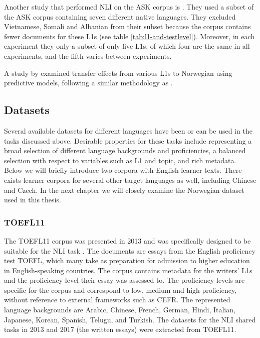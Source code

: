 Another study that performed NLI on the ASK corpus is
\textcite{ionescu2016string}. They used a subset of the ASK corpus containing
seven different native languages. They excluded Vietnamese, Somali and
Albanian from their subset because the corpus contains fewer documents for
these \acp{L1} (see table \ref{tab:l1-and-testlevel}). Moreover, in each
experiment they only a subset of only five \acp{L1}, of which four are the
same in all experiments, and the fifth varies between experiments.

A study by \textcite{pepper2012} examined transfer effects from various
\acp{L1} to Norwegian using predictive models, following a similar
methodology as \textcite{jarvis2012detecting}.


\subsection{Datasets}

Several available datasets for different languages have been or can be used
in the tasks discussed above. Desirable properties for these tasks include
representing a broad selection of different language backgrounds and
proficiencies, a balanced selection with respect to variables such as L1 and
topic, and rich metadata. Below we will briefly introduce two corpora with
English learner texts. There exists learner corpora for several other target
languages as well, including Chinese and Czech. In the next chapter we will
closely examine the Norwegian dataset used in this thesis.


\subsubsection{TOEFL11}

The TOEFL11 corpus was presented in 2013 and was specifically designed to be
suitable for the \ac{NLI} task \autocite{blanchard13}. The documents are
essays from the English proficiency test TOEFL, which many take as
preparation for admission to higher education in English-speaking countries.
The corpus contains metadata for the writers' L1s and the proficiency level
their essay was assessed to. The proficiency levels are specific for the
corpus and correspond to low, medium and high proficiency, without reference
to external frameworks such as \ac{CEFR}. The represented language
backgrounds are Arabic, Chinese, French, German, Hindi, Italian, Japanese,
Korean, Spanish, Telugu, and Turkish. The datasets for the \ac{NLI} shared
tasks in 2013 and 2017 (the written essays) were extracted from TOEFL11.

